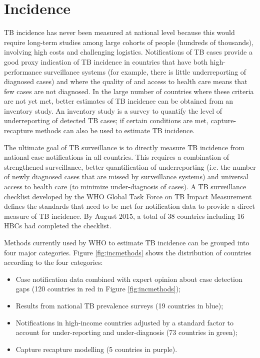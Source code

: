 \section{Incidence}

TB incidence has never been measured at national level because this would require long-term studies among large cohorts of people (hundreds of thousands), involving high costs and challenging logistics. Notifications of TB cases provide a good proxy indication of TB incidence in countries that have both high-performance surveillance systems (for example, there is little underreporting of diagnosed cases) and where the quality of and access to health care means that few cases are not diagnosed. In the large number of countries where these criteria are not yet met, better estimates of TB incidence can be obtained from an inventory study. An inventory study is a survey to quantify the level of underreporting of detected TB cases; if certain conditions are met, capture-recapture methods can also be used to estimate TB incidence\cite{WHO2012}. 

The ultimate goal of TB surveillance is to directly measure TB incidence from national case notifications in all countries. This requires a combination of strengthened surveillance, better quantification of underreporting (i.e. the number of newly diagnosed cases that are missed by surveillance systems) and universal access to health care (to minimize under-diagnosis of cases). A TB surveillance checklist developed by the WHO Global Task Force on TB Impact Measurement defines the standards that need to be met for notification data to provide a direct measure of TB incidence\cite{WHO2014}. By August 2015, a total of 38 countries including 16 HBCs had completed the checklist. 

Methods currently used by WHO to estimate TB incidence can be grouped into four major categories. Figure \ref{fig:incmethods} shows the distribution of countries according to the four categories: 

\begin{itemize}
\item Case notification data combined with expert opinion about case detection gaps (120 countries in red in Figure \ref{fig:incmethods});
\item Results from national TB prevalence surveys (19 countries in blue);
\item Notifications in high-income countries adjusted by a standard factor to account for under-reporting and under-diagnosis (73 countries in green);
\item Capture recapture modelling (5 countries in purple).
\end{itemize}






  
  
  
  
  
  
  
  
  
  